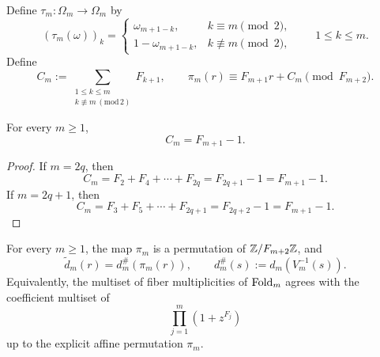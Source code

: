 \begin{definition}
\label{def:affine-map}
Define \(\tau_m\colon \Omega_m\to\Omega_m\) by
\[
  (\tau_m(\omega))_k=
  \begin{cases}
    \omega_{m+1-k}, & k\equiv m \pmod 2,\\[4pt]
    1-\omega_{m+1-k}, & k\not\equiv m \pmod 2,
  \end{cases}
  \qquad 1\le k\le m.
\]
Define
\[
  C_m:=\sum_{\substack{1\le k\le m\\ k\not\equiv m \,(\mathrm{mod}\,2)}}F_{k+1},
  \qquad
  \pi_m(r)\equiv F_{m+1}r+C_m \pmod{F_{m+2}}.
\]
\end{definition}

\begin{lemma}
\label{lem:Cm-closed}
For every \(m\ge 1\),
\[
  C_m=F_{m+1}-1.
\]
\end{lemma}

\begin{proof}
If \(m=2q\), then
\[
  C_m=F_2+F_4+\cdots+F_{2q}=F_{2q+1}-1=F_{m+1}-1.
\]
If \(m=2q+1\), then
\[
  C_m=F_3+F_5+\cdots+F_{2q+1}=F_{2q+2}-1=F_{m+1}-1.
\]
\end{proof}

\begin{theorem}
\label{thm:affine-transfer}
For every \(m\ge 1\), the map \(\pi_m\) is a permutation of
\(\mathbb{Z}/F_{m+2}\mathbb{Z}\), and
\[
  \widetilde d_m(r)=d_m^\#(\pi_m(r)),
  \qquad
  d_m^\#(s):=d_m(V_m^{-1}(s)).
\]
Equivalently, the multiset of fiber multiplicities of \(\mathrm{Fold}_m\) agrees with
the coefficient multiset of
\[
  \prod_{j=1}^m(1+z^{F_j})
\]
up to the explicit affine permutation \(\pi_m\).
\end{theorem}

